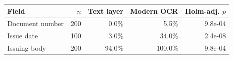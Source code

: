 \begin{tabular}{lrrrr}
\toprule
Field & $n$ & Text layer & Modern OCR & Holm-adj. $p$ \\
\midrule
Document number & 200 & 0.0\% & 5.5\% & 9.8e-04 \\
Issue date & 100 & 3.0\% & 34.0\% & 2.4e-08 \\
Issuing body & 200 & 94.0\% & 100.0\% & 9.8e-04 \\
\bottomrule
\end{tabular}
